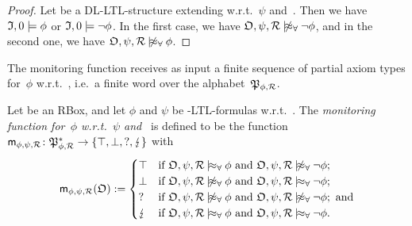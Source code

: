 \begin{proof}
    Let \Imf be a DL-LTL-structure extending \Omf w.r.t.~$\psi$ and~\Rmc.  Then
    we have $\mathfrak{I},0\models\phi$ or $\mathfrak{I},0\models\lnot\phi$.  In the first case,
    we have $\Omf,\psi,\Rmc\notmodelsal\lnot\phi$, and in the second one, we
    have $\Omf,\psi,\Rmc\notmodelsal\phi$.
\end{proof}

\noindent
The monitoring function receives as input a finite sequence of partial axiom
types for~$\phi$ w.r.t.~\Rmc, i.e.~a finite word over the
alphabet~$\mathfrak{P}_{\phi,\mathcal{R}}$.

\begin{definition}\label{def:monitoring-function}
    Let \Rmc be an RBox, and let $\phi$ and $\psi$ be \SHOQ-LTL-formulas
    w.r.t.~\Rmc.  The \emph{monitoring function for~$\phi$ w.r.t.~$\psi$
    and~\Rmc} is defined to be the function
    $\mathsf{m}_{\phi,\psi,\mathcal{R}}\colon\mathfrak{P}_{\phi,\mathcal{R}}^*\to\{\top,\bot,{?},\lightning\}$
    with
    \[\msf_{\phi,\psi,\Rmc}(\Omf):=\begin{cases}
        \top       &\text{if}\ \Omf,\psi,\Rmc\modelsal\phi\ \text{and}\ \Omf,\psi,\Rmc\notmodelsal\lnot\phi;\\
        \bot       &\text{if}\ \Omf,\psi,\Rmc\notmodelsal\phi\ \text{and}\ \Omf,\psi,\Rmc\modelsal\lnot\phi;\\
        {?}        &\text{if}\ \Omf,\psi,\Rmc\notmodelsal\phi\ \text{and}\ \Omf,\psi,\Rmc\notmodelsal\lnot\phi;\ \text{and}\\
        \lightning &\text{if}\ \Omf,\psi,\Rmc\modelsal\phi\ \text{and}\ \Omf,\psi,\Rmc\modelsal\lnot\phi.
    \end{cases}\]
\end{definition}

